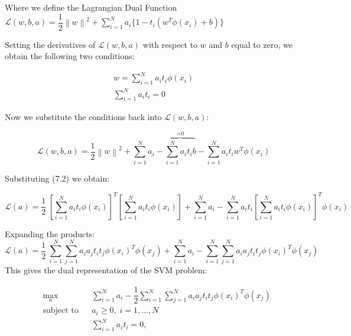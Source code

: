 \documentclass[twoside]{article}
\newcommand{\norm}[1]{\left\lVert #1 \right\rVert}
\begin{document}
Where we define the Lagrangian Dual Function $\mathcal{L}(w,b,a) = \dfrac{1}{2} \norm{w}^2 + \sum_{i=1}^{N} a_i\{ 1- t_{i}(w^T \phi(x_{i}) +b) \} $

Setting the derivatives of $\mathcal{L}(w,b,a)$ with respect to $w$ and $b$ equal to zero, we obtain the following two conditions:

\begin{align}
       w = \sum_{i=1}^{N} a_{i}t_{i}\phi(x_{i})  \\        
    \sum_{i=1}^{N} a_{i}t_{i} = 0
\end{align}


Now we substitute the conditions back into $\mathcal{L}(w,b,a)$:

\begin{equation*}
    \mathcal{L}(w,b,a) = \dfrac{1}{2} \norm{w}^2 + \sum_{i=1}^{N} a_{i} 
    - \overbrace{\sum_{i=1}^{N} a_{i}t_{i}b}^\text{=0} - \sum_{i=1}^{N} a_{i}t_{i} w^T \phi(x_{i})
\end{equation*}

Substituting (7.2) we obtain:

\begin{equation*}
    \mathcal{L}(a) = \dfrac{1}{2} \  [\sum_{i=1}^{N} a_{i}t_{i}\phi(x_{i})]^T [\sum_{i=1}^{N} a_{i}t_{i}\phi(x_{i})] + \sum_{i=1}^{N} a_{i} - \sum_{i=1}^{N} a_{i} t_{i} [\sum_{i=1}^{N} a_{i}t_{i}\phi(x_{i})]^T \phi(x_{i})
    \end{equation*}
    
Expanding the products:
\begin{equation*}
    \mathcal{L}(a) = \dfrac{1}{2} \  \sum_{i=1}^{N} { \sum_{j=1}^{N} a_{i} a_{j} t_{i} t_{j} \phi(x_{i})^T \phi(x_{j})}
    + \sum_{i=1}^{N} a_{i}  -
    \sum_{i=1}^{N} { \sum_{j=1}^{N} a_{i} a_{j} t_{i} t_{j} \phi(x_{i})^T \phi(x_{j})}
    \end{equation*}
\newpage
This gives the dual representation of the SVM problem:

\begin{equation*}
\begin{aligned}
& \underset{a}{\text{max}}
& & \sum_{i=1}^{N} a_{i}  - \dfrac{1}{2}
    \sum_{i=1}^{N} { \sum_{j=1}^{N} a_{i} a_{j} t_{i} t_{j} \phi(x_{i})^T \phi(x_{j})}\\
& \text{subject to}
& & a_{i}  \geq 0, \; i = 1, \ldots, N \\
&&& \sum_{i=1}^{N} a_{i}t_{i} = 0, 
\end{aligned}
\end{equation*}
\end{document}
